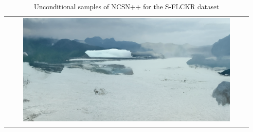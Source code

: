 \begin{longtable}{c}
    \includegraphics[width=0.87\textwidth]{Chapters/figures/appendix/flickr/9_uncond_sample.png} \\
    \caption{Unconditional samples of NCSN++ for the S-FLCKR dataset}
\end{longtable}
